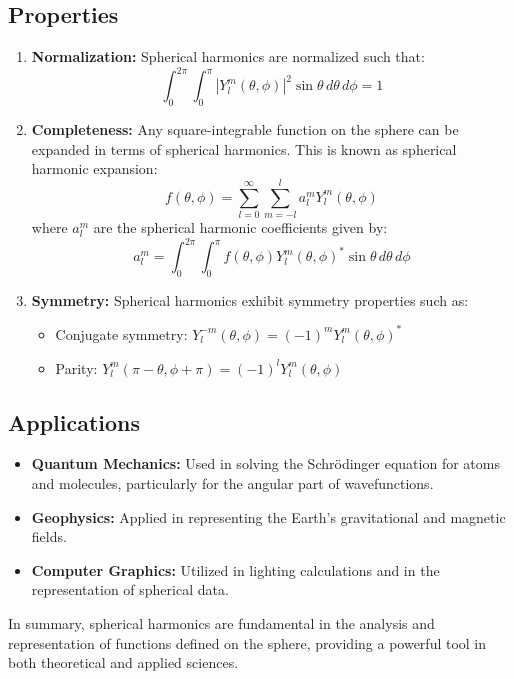 \subsection*{Properties}

\begin{enumerate}
	\item \textbf{Normalization:}
	Spherical harmonics are normalized such that:
	\[
	\int_0^{2\pi} \int_0^{\pi} |Y_l^m(\theta, \phi)|^2 \sin \theta \, d\theta \, d\phi = 1
	\]
	
	\item \textbf{Completeness:}
	Any square-integrable function on the sphere can be expanded in terms of spherical harmonics. This is known as spherical harmonic expansion:
	\[
	f(\theta, \phi) = \sum_{l=0}^{\infty} \sum_{m=-l}^{l} a_l^m Y_l^m(\theta, \phi)
	\]
	where \( a_l^m \) are the spherical harmonic coefficients given by:
	\[
	a_l^m = \int_0^{2\pi} \int_0^{\pi} f(\theta, \phi) Y_l^m(\theta, \phi)^* \sin \theta \, d\theta \, d\phi
	\]
	
	\item \textbf{Symmetry:}
	Spherical harmonics exhibit symmetry properties such as:
	\begin{itemize}
		\item Conjugate symmetry: \( Y_l^{-m}(\theta, \phi) = (-1)^m Y_l^m(\theta, \phi)^* \)
		\item Parity: \( Y_l^m(\pi - \theta, \phi + \pi) = (-1)^l Y_l^m(\theta, \phi) \)
	\end{itemize}
\end{enumerate}

\subsection*{Applications}

\begin{itemize}
	\item \textbf{Quantum Mechanics:} Used in solving the Schrödinger equation for atoms and molecules, particularly for the angular part of wavefunctions.
	\item \textbf{Geophysics:} Applied in representing the Earth's gravitational and magnetic fields.
	\item \textbf{Computer Graphics:} Utilized in lighting calculations and in the representation of spherical data.
\end{itemize}

In summary, spherical harmonics are fundamental in the analysis and representation of functions defined on the sphere, providing a powerful tool in both theoretical and applied sciences.


